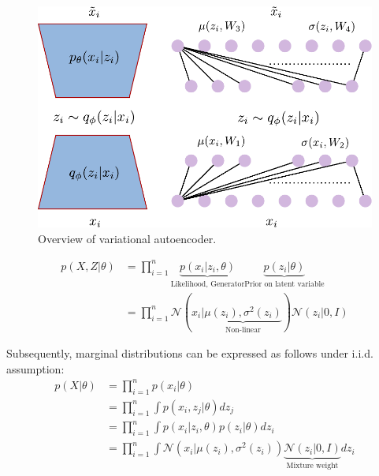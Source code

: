 \begin{figure}[h]
	\begin{center}
		\includegraphics[scale=0.5]{./images/generative/encoder.pdf}
	\end{center}
	\caption{Overview of variational autoencoder.}
	\label{fig:vae}
\end{figure}



\begin{align*}
	p(X,Z|\theta) &=  \prod_{i=1}^{n}\underbrace{p(x_i|z_i,\theta)}_{\textrm{Likelihood, Generator}}\underbrace{p(z_i|\theta)}_{\textrm{Prior on latent variable}}\\
	&= \prod_{i=1}^{n} \mathcal{N}(x_{i}|\underbrace{\mu(z_i), \sigma^2(z_i)}_{\textrm{Non-linear}}) \mathcal{N}(z_i|0, I)
\end{align*}

Subsequently, marginal distributions can be expressed as follows under i.i.d. assumption:
\begin{align*}
	p(X|\theta) &= \prod_{i=1}^{n} p(x_i|\theta) \\
	&= \prod_{i=1}^{n} \int p(x_i, z_j|\theta) dz_j \\
	& = \prod_{i=1}^{n} \int p(x_i|z_i, \theta)p(z_i|\theta)dz_i \\
	& = \prod_{i=1}^{n} \int \mathcal{N}(x_{i}|\mu(z_i), \sigma^2(z_i)) \underbrace{\mathcal{N}(z_i|0, I)}_{\textrm{Mixture weight}} dz_i
\end{align*}

